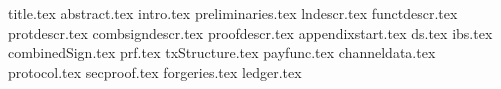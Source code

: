 \documentclass{llncs}
\begin{document}
\pagestyle{plain}
{title.tex}
{abstract.tex}
{intro.tex}
{preliminaries.tex}
{lndescr.tex}
{functdescr.tex}
{protdescr.tex}
{combsigndescr.tex}
{proofdescr.tex}
{appendixstart.tex} 
{ds.tex}
{ibs.tex}
{combinedSign.tex}
{prf.tex}
{txStructure.tex}
{payfunc.tex}
{channeldata.tex}
{protocol.tex}
{secproof.tex}
{forgeries.tex}
{ledger.tex}


\end{document}

